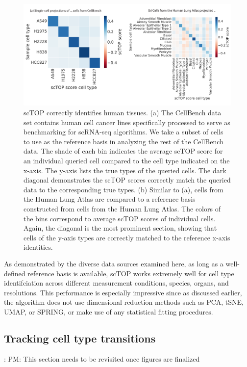 \documentclass[aps,superscriptaddress, notitlepage,longbibliography]{revtex4-1}
\begin{document}
\begin{figure}
	\centering
		\includegraphics[scale=0.8]{figs/fig3.pdf}
	\caption{scTOP correctly identifies human tissues. (a) The CellBench data set contains human cell cancer lines specifically processed to serve as benchmarking for scRNA-seq algorithms. We take a subset of cells to use as the reference basis in analyzing the rest of the CellBench data. The shade of each bin indicates the average scTOP score for an individual queried cell compared to the cell type indicated on the x-axis. The y-axis lists the true types of the queried cells. The dark diagonal demonstrates the scTOP scores correctly match the queried data to the corresponding true types. (b) Similar to (a), cells from the Human Lung Atlas are compared to a reference basis constructed from cells from the Human Lung Atlas. The colors of the bins correspond to average scTOP scores of individual cells. Again, the diagonal is the most prominent section, showing that cells of the y-axis types are correctly matched to the reference x-axis identities.}
	\label{FIG:3}
\end{figure}

As demonstrated by the diverse data sources examined here, as long as a well-defined reference basis is available, scTOP works extremely well  for cell type identifciation across different measurement conditions, species, organs, and resolutions. This performance is especially impressive since as discussed earlier, the algorithm does not use dimensional reduction methods such as PCA, tSNE, UMAP, or SPRING, or make use of any statistical fitting procedures.

\subsection{Tracking cell type transitions}

{\color{red}: PM: This section needs to be revisited once figures are finalized}
\end{document}
